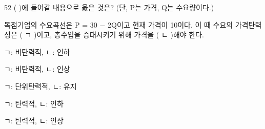 \begin{question}{52}
( )에 들어갈 내용으로 옳은 것은? (단, P는 가격, Q는 수요량이다.)
\begin{framedtext}
독점기업의 수요곡선은 P = 30 $-$ 2Q이고 현재 가격이 10이다. 이 때 수요의 가격탄력성은 ( ㄱ )이고, 총수입을 증대시키기 위해 가격을 ( ㄴ )해야 한다.
\end{framedtext}
\begin{choices}
  \item ㄱ: 비탄력적, ㄴ: 인하
  \item ㄱ: 비탄력적, ㄴ: 인상
  \item ㄱ: 단위탄력적, ㄴ: 유지
  \item ㄱ: 탄력적, ㄴ: 인하
  \item ㄱ: 탄력적, ㄴ: 인상
\end{choices}
\end{question}
